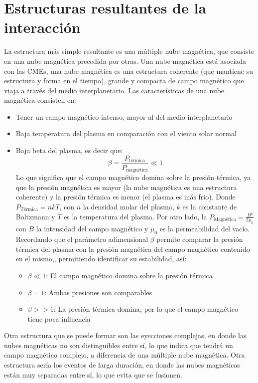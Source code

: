 \section{Estructuras resultantes de la interacción}
La estructura más simple resultante es una múltiple nube magnética, que consiste en una nube magnética precedida por otras. Una nube magnética está asociada con las CMEs, una nube magnética es una estructura coherente (que mantiene su estructura y forma en el tiempo), grande y compacta de campo magnético que viaja a través del medio interplanetario.
Las características de una nube magnética consisten en:
\begin{itemize}
    \item Tener un campo magnético intenso, mayor al del medio interplanetario
\item Baja temperatura del plasma en comparación con el viento solar normal
\item Baja beta del plasma, es decir que:
\begin{equation}
\beta= \frac{P_{\text{térmica}}}{P_{\text{magnética}}}\ll 1 \label{beta}
\end{equation}
Lo que significa que el campo magnético domina sobre la presión térmica, ya que la presión magnética es mayor (la nube magnética es una estructura coherente) y la presión térmica es menor (el plasma es más frío). Donde $P_{\text{Térmica}}=nkT$, con $n$ la densidad molar del plasma, $k$ es la constante de Boltzmann y $T$ es la temperatura del plasma. Por otro lado, la $P_{\text{Magnética}}=\frac{B²}{2 \mu_{0}}$ con $B$ la intensidad del campo magnético y $\mu_{0}$ es la permeabilidad del vacío.
Recordando que el parámetro adimensional $\beta$ permite comparar la presión térmica del plasma con la presión magnética del campo magnético contenido en el mismo,, permitiendo identificar su estabilidad, así:
\begin{itemize}
    \item $\beta\ll 1$: El campo magnético domina sobre la presión térmica
\item $\beta=1$: Ambas presiones son comparables
\item $\beta>>1$: La presión térmica domina, por lo que el campo magnético tiene poca influencia
\end{itemize}
\end{itemize}


Otra estructura que se puede formar son las eyecciones complejas, en donde las nubes magnéticas no son distinguibles entre sí, lo que indica que tendrá un campo magnético complejo, a diferencia de una múltiple nube magnética. Otra estructura sería los eventos de larga duración, en donde las nubes magnéticas están muy separadas entre sí, lo que evita que se fusionen.

